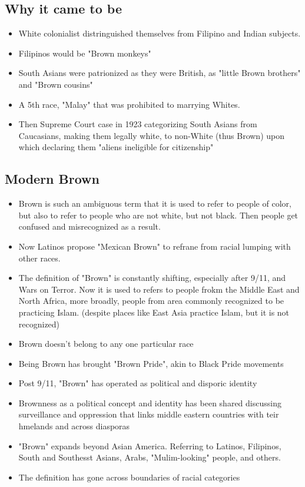 \documentclass{article}
\begin{document}
  \subsection{Why it came to be}
  \begin{itemize}
    \item White colonialist distringuished themselves from Filipino and
      Indian subjects.
    \item Filipinos would be "Brown monkeys"
    \item South Asians were patrionized as they were British,
      as "little Brown brothers" and "Brown cousins"
    \item A 5th race, "Malay" that was prohibited to marrying Whites.
    \item Then Supreme Court case in 1923 categorizing South Asians from
      Caucasians, making them legally white, to non-White (thus Brown)
      upon which declaring them "aliens ineligible for citizenship"
  \end{itemize}

  \subsection{Modern Brown}
  \begin{itemize}
    \item Brown is such an ambiguous term that it is used to refer to
      people of color, but also to refer to people who are not
      white, but not black. Then people get confused and misrecognized
      as a result.
    \item Now Latinos propose "Mexican Brown" to refrane from racial
      lumping with other races.
    \item The definition of "Brown" is constantly shifting, especially after
      9/11, and Wars on Terror. Now it is used to refers to people
      frokm the Middle East and North Africa, more broadly, people
      from area commonly recognized to be practicing Islam.
      (despite places like East Asia practice Islam, but it is not recognized)
    \item Brown doesn't belong to any one particular race
    \item Being Brown has brought "Brown Pride", akin to Black Pride movements
    \item Post 9/11, "Brown" has operated as political and disporic identity
    \item Brownness as a political concept and identity has been shared
      discussing surveillance and oppression that links middle eastern countries
      with teir hmelands and across diasporas
    \item "Brown" expands beyond Asian America. Referring to Latinos,
      Filipinos, South and Southesst Asians, Arabs, "Mulim-looking" people,
      and others.
    \item The definition has gone across boundaries of racial categories
  \end{itemize}
\end{document}
